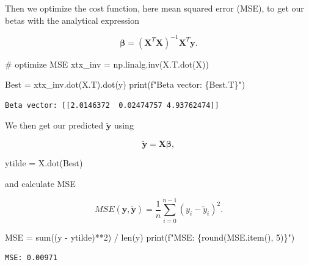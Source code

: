\documentclass[
  letterpaper,
  DIV=11,
  numbers=noendperiod]{scrartcl}
\newenvironment{Shaded}{\begin{snugshade}}{\end{snugshade}}
\newcommand{\BuiltInTok}[1]{\textcolor[rgb]{0.00,0.23,0.31}{#1}}
\newcommand{\CommentTok}[1]{\textcolor[rgb]{0.37,0.37,0.37}{#1}}
\newcommand{\DecValTok}[1]{\textcolor[rgb]{0.68,0.00,0.00}{#1}}
\newcommand{\NormalTok}[1]{\textcolor[rgb]{0.00,0.23,0.31}{#1}}
\newcommand{\OperatorTok}[1]{\textcolor[rgb]{0.37,0.37,0.37}{#1}}
\newcommand{\SpecialCharTok}[1]{\textcolor[rgb]{0.37,0.37,0.37}{#1}}
\newcommand{\SpecialStringTok}[1]{\textcolor[rgb]{0.13,0.47,0.30}{#1}}
\begin{document}
Then we optimize the cost function, here mean squared error (MSE), to
get our betas with the analytical expression

\[
\boldsymbol{\beta} =\left(\boldsymbol{X}^T\boldsymbol{X}\right)^{-1}\boldsymbol{X}^T\boldsymbol{y}.
\]

\begin{Shaded}
\begin{Highlighting}[]
\CommentTok{\# optimize MSE}
\NormalTok{xtx\_inv }\OperatorTok{=}\NormalTok{ np.linalg.inv(X.T.dot(X))}

\NormalTok{Best }\OperatorTok{=}\NormalTok{ xtx\_inv.dot(X.T).dot(y)}
\BuiltInTok{print}\NormalTok{(}\SpecialStringTok{f"Beta vector: }\SpecialCharTok{\{}\NormalTok{Best}\SpecialCharTok{.}\NormalTok{T}\SpecialCharTok{\}}\SpecialStringTok{"}\NormalTok{)}
\end{Highlighting}
\end{Shaded}

\begin{verbatim}
Beta vector: [[2.0146372  0.02474757 4.93762474]]
\end{verbatim}

We then get our predicted \(\boldsymbol{\widetilde{y}}\) using

\[
\boldsymbol{\tilde{y}}= \boldsymbol{X}\boldsymbol{\beta},
\]

\begin{Shaded}
\begin{Highlighting}[]
\NormalTok{ytilde }\OperatorTok{=}\NormalTok{ X.dot(Best)}
\end{Highlighting}
\end{Shaded}

and calculate MSE

\[
MSE(\boldsymbol{y},\boldsymbol{\tilde{y}}) = \frac{1}{n}
\sum_{i=0}^{n-1}(y_i-\tilde{y}_i)^2.
\]

\begin{Shaded}
\begin{Highlighting}[]
\NormalTok{MSE }\OperatorTok{=} \BuiltInTok{sum}\NormalTok{((y }\OperatorTok{{-}}\NormalTok{ ytilde)}\OperatorTok{**}\DecValTok{2}\NormalTok{) }\OperatorTok{/} \BuiltInTok{len}\NormalTok{(y)}
\BuiltInTok{print}\NormalTok{(}\SpecialStringTok{f"MSE: }\SpecialCharTok{\{}\BuiltInTok{round}\NormalTok{(MSE.item(), }\DecValTok{5}\NormalTok{)}\SpecialCharTok{\}}\SpecialStringTok{"}\NormalTok{)}
\end{Highlighting}
\end{Shaded}

\begin{verbatim}
MSE: 0.00971
\end{verbatim}
\end{document}
